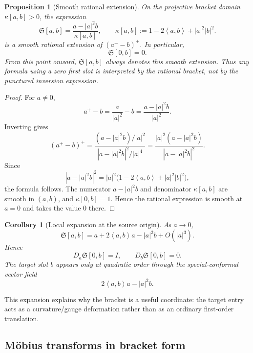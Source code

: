 \documentclass[11pt]{article}
\newtheorem{proposition}[theorem]{Proposition}
\newtheorem{corollary}[theorem]{Corollary}
\newcommand{\ip}[2]{\left\langle #1,#2\right\rangle}
\newcommand{\norm}[1]{\left|#1\right|}
\newcommand{\Sbr}[2]{\mathfrak S[#1,#2]}
\newcommand{\kap}[2]{\kappa[#1,#2]}
\begin{document}
\begin{proposition}[Smooth rational extension]
On the projective bracket domain $\kap{a}{b}>0$, the expression
\[
    \Sbr{a}{b}=\frac{a-\norm a^2 b}{\kap{a}{b}},
    \qquad
    \kap{a}{b}:=1-2\ip a b+\norm a^2\norm b^2.
\]
is a smooth rational extension of $(a^+-b)^+$.  In particular,
\[
    \Sbr{0}{b}=0.
\]
From this point onward, $\Sbr{a}{b}$ always denotes this smooth extension.  Thus any formula using a zero first slot is interpreted by the rational bracket, not by the punctured inversion expression.
\end{proposition}

\begin{proof}
For $a\neq0$,
\[
    a^+-b=\frac{a}{\norm a^2}-b=\frac{a-\norm a^2b}{\norm a^2}.
\]
Inverting gives
\[
    (a^+-b)^+
    =\frac{(a-\norm a^2b)/\norm a^2}{\norm{a-\norm a^2b}^2/\norm a^4}
    =\frac{\norm a^2(a-\norm a^2b)}{\norm{a-\norm a^2b}^2}.
\]
Since
\[
    \norm{a-\norm a^2b}^2
    =\norm a^2\bigl(1-2\ip a b+\norm a^2\norm b^2\bigr),
\]
the formula follows.  The numerator $a-\norm a^2b$ and denominator $\kap{a}{b}$ are smooth in $(a,b)$, and $\kap{0}{b}=1$.  Hence the rational expression is smooth at $a=0$ and takes the value $0$ there.
\end{proof}

\begin{corollary}[Local expansion at the source origin]
As $a\to0$,
\[
    \Sbr{a}{b}=a+2\ip a b a-\norm a^2 b+O(\norm a^3).
\]
Hence
\[
    D_a\Sbr{0}{b}=I,
    \qquad
    D_b\Sbr{0}{b}=0.
\]
The target slot $b$ appears only at quadratic order through the special-conformal vector field
\[
    2\ip a b a-\norm a^2b.
\]
\end{corollary}

This expansion explains why the bracket is a useful coordinate: the target entry acts as a curvature/gauge deformation rather than as an ordinary first-order translation.


\subsection{Möbius transforms in bracket form}
\end{document}
